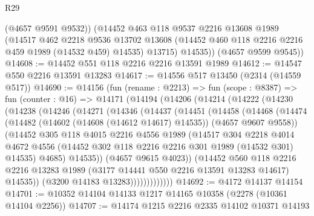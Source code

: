 \begin{lexlean}{R29}
\begin{coremodule}
          (@4657 @9591 @9532))
        (@14452
          @463
          @118
          @9537
          @2216
          @13608
          @1989
          (@14517
            @462
            @2218
            @9536
            @13702
            @13608
            (@14452 @460 @118 @2216 @2216 @459 @1989 (@14532 @459) @14535)
            @13715)
          @14535))
      (@4657 @9599 @9545))
@14608 := @14452 @551 @118 @2216 @2216 @13591 @1989
@14612 := @14547 @550 @2216 @13591 @13283
@14617 := @14556 @517 @13450 (@2314 (@14559 @517))
@14690 := @14156
    (fun (rename : @2213) =>
    fun (scope : @8387) =>
    fun (counter : @16) =>
    @14171
      (@14194
        (@14206
          (@14214
            (@14222
              (@14230
                (@14238
                  (@14246
                    (@14271
                      (@14346
                        (@14437
                          (@14451
                            (@14458
                              (@14468
                                (@14474
                                  (@14482
                                    (@14602 (@14608 (@14612 @14617) @14535))
                                    (@4657 @9607 @9558))
                                  (@14452
                                    @305
                                    @118
                                    @4015
                                    @2216
                                    @4556
                                    @1989
                                    (@14517
                                      @304
                                      @2218
                                      @4014
                                      @4672
                                      @4556
                                      (@14452 @302 @118 @2216 @2216 @301 @1989 (@14532 @301) @14535)
                                      @4685)
                                    @14535))
                                (@4657 @9615 @4023))
                              (@14452
                                @560
                                @118
                                @2216
                                @2216
                                @13283
                                @1989
                                (@3177 @14441 @550 @2216 @13591 @13283 @14617)
                                @14535))
                            (@3200 @14183 @13283)))))))))))))
@14692 := @4172 @14137 @14154
@14701 := @10352 @14104 @14133 @1217 @14165 @10358 (@2278 (@10361 @14104 @2256))
@14707 := @14174 @1215 @2216 @2335 @14102 @10371 @14193

\end{coremodule}
\end{lexlean}

